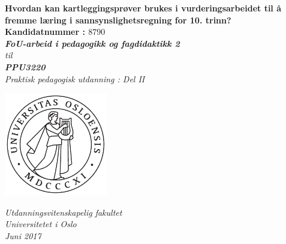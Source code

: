\documentclass[main.tex]{subfiles}
\begin{document}
\thispagestyle{empty}
\begin{center}        %
  \vspace{5mm}        %
  \LARGE
  \textbf{Hvordan kan kartleggingsprøver brukes i vurderingsarbeidet til å fremme læring i 
          sannsynslighetsregning for 10. trinn?} \\
  \Large
  \vspace{10mm}
  \large
  \textbf{Kandidatnummer : $8790$} \\
  \vspace{20mm}
  \Large
  {\bf{\textsl{FoU-arbeid i pedagogikk og fagdidaktikk 2}}} \\
  \textsl{til} \\
  \vspace{2mm}
  {\bf{\textsl{PPU3220}}} \\
  \vspace{5mm}
  {\large \textsl {Praktisk pedagogisk utdanning : Del II}}\\
  \vspace{10mm}
  \centerline{\includegraphics[width=45mm,height=45mm]{../figures/uiosegl.pdf}} 
  \vspace{8mm}
  \textsl{Utdanningsvitenskapelig fakultet} \\
  \textsl{Universitetet i Oslo} \\
  \vspace{5mm}
  \large
  \textsl{Juni 2017} \\
  \vspace{2cm}


\end{center}
\end{document}
